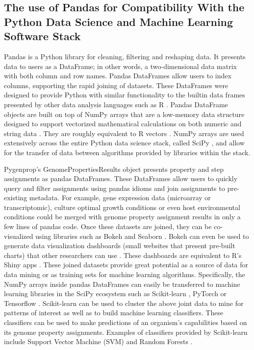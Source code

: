 \subsection{The use of Pandas for Compatibility With the Python Data Science and Machine Learning Software Stack}

Pandas is a Python library for cleaning, filtering and reshaping data. It presents data to users as a DataFrame; in other words, a two-dimensional data matrix with both column and row names. Pandas DataFrames allow users to index columns, supporting the rapid joining of datasets. These DataFrames were designed to provide Python with similar functionality to the builtin data frames presented by other data analysis languages such as R \cite{rprogman}. Pandas DataFrame objects are built on top of NumPy arrays \cite{mckinney2010data} that are a low-memory data structure designed to support vectorized mathematical calculations on both numeric and string data \cite{van2011numpy}. They are roughly equivalent to R vectors \cite{rprogman}. NumPy arrays are used extensively across the entire Python data science stack, called SciPy \cite{scipystack}, and allow for the transfer of data between algorithms provided by libraries within the stack.

Pygenprop's GenomePropertiesResults object presents property and step assignments as pandas DataFrames. These DataFrames allow users to quickly query and filter assignments using pandas idioms and join assignments to pre-existing metadata. For example, gene expression data (microarray or transcriptomic), culture optimal growth conditions or even host environmental conditions could be merged with genome property assignment results in only a few lines of pandas code. Once these datasets are joined, they can be co-visualized using libraries such as Bokeh \cite{bokeh} and Seaborn \cite{seaborn}. Bokeh can even be used to generate data visualization dashboards (small websites that present pre-built charts) that other researchers can use \cite{bokeh}. These dashboards are equivalent to R's Shiny apps \cite{beeley2013web}. These joined datasets provide great potential as a source of data for data mining or as training sets for machine learning algorithms. Specifically, the NumPy arrays inside pandas DataFrames can easily be transferred to machine learning libraries in the SciPy ecosystem such as Scikit-learn \cite{pedregosa2011scikit}, PyTorch \cite{Paszke2017} or Tensorflow \cite{abadi2016tensorflow}. Scikit-learn can be used to cluster the above joint data to mine for patterns of interest as well as to build machine learning classifiers. These classifiers can be used to make predictions of an organism's capabilities based on its genome property assignments. Examples of classifiers provided by Scikit-learn include Support Vector Machine (SVM) and Random Forests \cite{pedregosa2011scikit}.

